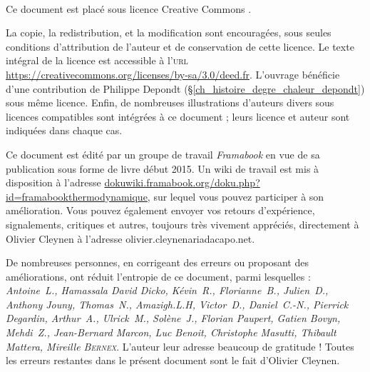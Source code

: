 \clearpage\thispagestyle{empty}



\vspace{-0.5cm}
{\center \normalsize \huge \ccLogo\ \ccAttribution\ \ccShareAlike \par}
\vspace{0.5cm}

Ce document est placé sous licence Creative Commons \myccbysa.

La copie, la redistribution, et la modification sont encouragées, sous seules conditions d’attribution de l’auteur et de conservation de cette licence. Le texte intégral de la licence est accessible à l’\textsc{url} \href{https://creativecommons.org/licenses/by-sa/3.0/deed.fr}{https://creativecommons.org/licenses/by-sa/3.0/deed.fr}. L’ouvrage bénéficie d’une contribution de Philippe Depondt (\S\ref{ch_histoire_degre_chaleur_depondt}) sous même licence. Enfin, de nombreuses illustrations d’auteurs divers sous licences compatibles sont intégrées à ce document ; leurs licence et auteur sont indiquées dans chaque cas.

\vspace{0.3cm}
\vspace{0.1cm}

Ce document est édité par un groupe de travail \textit{Framabook} en vue de sa publication sous forme de livre début 2015. Un wiki de travail est mis à disposition à l’adresse \href{http://dokuwiki.framabook.org/doku.php?id=framabookthermodynamique}{dokuwiki.framabook.org/doku.php?id=framabookthermodynamique}, sur lequel vous pouvez participer à son amélioration. Vous pouvez également envoyer vos retours d’expérience, signalements, critiques et autres, toujours très vivement appréciés, directement à Olivier Cleynen à l’adresse olivier.cleynenariadacapo.net.

De nombreuses personnes, en corrigeant des erreurs ou proposant des améliorations, ont réduit l’entropie de ce document, parmi lesquelles : {\small\textit{Antoine\ L., Hamassala David Dicko, Kévin\ R., Florianne\ B., Julien\ D., Anthony Jouny, Thomas\ N., Amazigh.L.H, Victor\ D., Daniel\ C.-N., Pierrick Degardin, Arthur\ A., Ulrick\ M., Solène\ J., Florian Paupert, Gatien Bovyn, Mehdi\ Z., Jean-Bernard Marcon, Luc Benoit, Christophe Masutti, Thibault Mattera, Mireille \textsc{Bernex}}}. L’auteur leur adresse beaucoup de gratitude ! Toutes les erreurs restantes dans le présent document sont le fait d’Olivier Cleynen.

\vspace{0.3cm}


\restoregeometry
